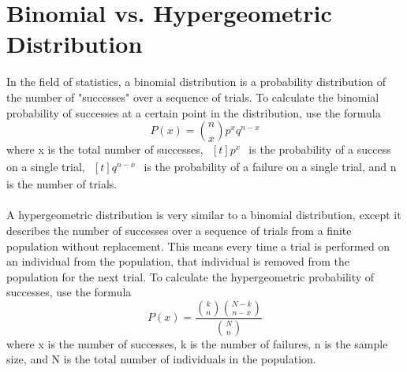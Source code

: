 \documentclass[letterpaper, 10pt,DIV=13]{scrartcl}
\numberwithin{equation}{section} %
\numberwithin{figure}{section} %
\numberwithin{table}{section} %
\begin{document}
\section{Binomial vs. Hypergeometric Distribution}\label{operations}
In the field of statistics, a binomial distribution is a probability distribution of the number of "successes" over a sequence of trials. To calculate the binomial probability of successes at a certain point in the distribution, use the formula \[ P(x) = \binom{n}{x}p^{x}q^{n-x} \] where x is the total number of successes, $\begin{aligned}[t] p^{x} \end{aligned}$ is the probability of a success on a single trial, $\begin{aligned}[t] q^{n-x}  \end{aligned}$ is the probability of a failure on a single trial, and n is the number of trials. \\
\\
A hypergeometric distribution is very similar to a binomial distribution, except it describes the number of successes over a sequence of trials from a finite population without replacement. This means every time a trial is performed on an individual from the population, that individual is removed from the population for the next trial. To calculate the hypergeometric probability of successes, use the formula \[P(x) = \frac{\binom{k}{n}\binom{N-k}{n-x}}{\binom{N}{n}}\] where x is the number of successes, k is the number of failures, n is the sample size, and N is the total number of individuals in the population. \\
\\
\end{document}
